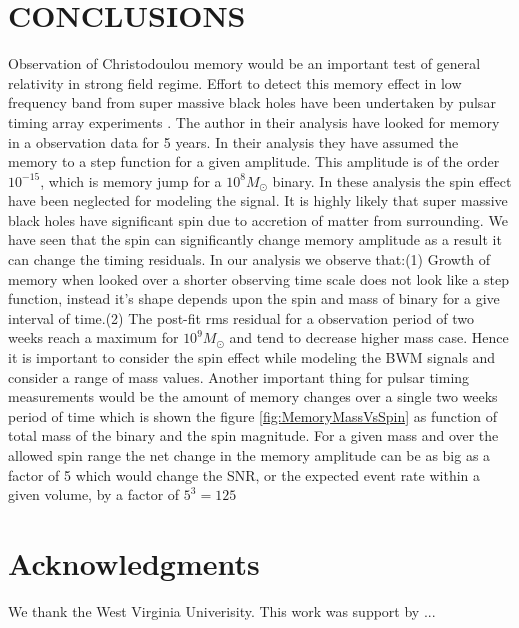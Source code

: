 \documentclass[twocolumn,showpacs,aps,prd,nobibnotes,floatfix]{revtex4-1}
\begin{document}
\section{CONCLUSIONS}
Observation of Christodoulou memory would be an important test of general relativity in strong field regime. Effort to detect this memory effect in low frequency band from super massive black holes have been undertaken by pulsar timing array experiments \cite{Arzoumanian2015}. The author in their analysis have looked for memory in a observation data for 5 years. In their analysis they have assumed the memory to a step function for a given amplitude. This amplitude is of the order $10^{-15}$, which is memory jump for a $10^{8}M_{\odot}$ binary. In these analysis the spin effect have been neglected for modeling the signal. It is highly likely that super massive black holes have significant spin due to accretion of matter from surrounding. We have seen that the spin can significantly change memory amplitude as a result it can change the timing residuals. In our analysis we observe that:(1) Growth of memory when looked over a shorter observing time scale does not look like a step function, instead it's shape depends upon the spin and mass of binary for a give interval of time.(2) The post-fit rms residual for a observation period of two weeks reach a maximum for $10^{9}M_{\odot}$ and tend to decrease higher mass case. Hence it is important to consider the spin effect while modeling the BWM signals and consider a range of mass values. Another important thing for pulsar timing measurements would be the amount of memory changes over a single two weeks period of time which is shown the figure \ref{fig:MemoryMassVsSpin} as function of total mass of the binary and the spin magnitude. For a given mass and over the allowed spin range the net change in the memory amplitude can be as big as a factor of 5 which would change the SNR, or the expected event rate within a given volume, by a factor of $5^{3}=125$

\section{Acknowledgments}
We thank the West Virginia Univerisity. This work was support by ... 
\end{document}
